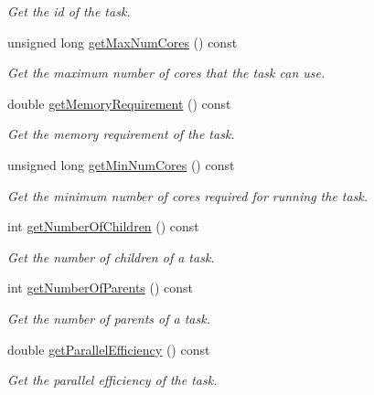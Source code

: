 \begin{DoxyCompactItemize}
\begin{DoxyCompactList}\small\item\em Get the id of the task. \end{DoxyCompactList}\item 
unsigned long \hyperlink{classwrench_1_1_workflow_task_aa470fe4c0a34211165989afabcba795f}{get\+Max\+Num\+Cores} () const
\begin{DoxyCompactList}\small\item\em Get the maximum number of cores that the task can use. \end{DoxyCompactList}\item 
double \hyperlink{classwrench_1_1_workflow_task_aeafc6e6f0bce5853a3fd1e4818638908}{get\+Memory\+Requirement} () const
\begin{DoxyCompactList}\small\item\em Get the memory requirement of the task. \end{DoxyCompactList}\item 
unsigned long \hyperlink{classwrench_1_1_workflow_task_a05d06d1988745735016dcf19d38e2398}{get\+Min\+Num\+Cores} () const
\begin{DoxyCompactList}\small\item\em Get the minimum number of cores required for running the task. \end{DoxyCompactList}\item 
int \hyperlink{classwrench_1_1_workflow_task_a6d69d3c969a5cb32a3a53ec20fb6f6cb}{get\+Number\+Of\+Children} () const
\begin{DoxyCompactList}\small\item\em Get the number of children of a task. \end{DoxyCompactList}\item 
int \hyperlink{classwrench_1_1_workflow_task_ab0c0bc84347585a8ea8ca45251931304}{get\+Number\+Of\+Parents} () const
\begin{DoxyCompactList}\small\item\em Get the number of parents of a task. \end{DoxyCompactList}\item 
double \hyperlink{classwrench_1_1_workflow_task_ab7e3113ba73aebc6e2776a6e56984662}{get\+Parallel\+Efficiency} () const
\begin{DoxyCompactList}\small\item\em Get the parallel efficiency of the task. \end{DoxyCompactList}\end{DoxyCompactItemize}


